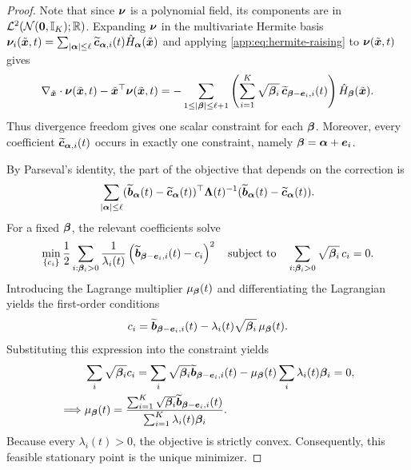 \begin{proof}
Note that since $\boldsymbol{\nu}$ is a polynomial field, its components are in $\mathcal{L}^2(\mathcal{N}(\boldsymbol{0},\mathbb{I}_K);\mathbb{R})$.
Expanding $\boldsymbol{\nu}$ in the multivariate Hermite basis $\boldsymbol{\nu}_i(\tilde{\boldsymbol{x}}, t)=\sum_{|\boldsymbol{\alpha}|\leq\ell}\widetilde{\boldsymbol{c}}_{\boldsymbol{\alpha},i}(t)\hat{H}_{\boldsymbol{\alpha}}(\tilde{\boldsymbol{x}})$ and applying \cref{app:eq:hermite-raising} to $\boldsymbol{\nu}(\tilde{\boldsymbol{x}}, t)$ gives
\begin{equation}\label{app:eq:hermite-stein-action}
\nabla_{\tilde{\boldsymbol{x}}}\cdot\boldsymbol{\nu}(\tilde{\boldsymbol{x}}, t) -\tilde{\boldsymbol{x}}^\top\boldsymbol{\nu}(\tilde{\boldsymbol{x}}, t) =-\sum_{1 \leq |\boldsymbol{\beta}| \leq \ell+1} \left( \sum_{i=1}^K\sqrt{\boldsymbol{\beta}_i}\, \widetilde{\boldsymbol{c}}_{\boldsymbol{\beta}-\boldsymbol{e}_i,i}(t) \right)\hat{H}_{\boldsymbol{\beta}}(\tilde{\boldsymbol{x}}).
\end{equation}
Thus divergence freedom gives one scalar constraint for each $\boldsymbol{\beta}$.
Moreover, every coefficient $\widetilde{\boldsymbol{c}}_{\boldsymbol{\alpha},i}(t)$ occurs in exactly one constraint, namely $\boldsymbol{\beta}=\boldsymbol{\alpha}+\boldsymbol{e}_i$.

By Parseval's identity, the part of the objective that depends on the correction is
\begin{equation*}
\sum_{|\boldsymbol{\alpha}|\leq\ell} (\widetilde{\boldsymbol{b}}_{\boldsymbol{\alpha}}(t)- \widetilde{\boldsymbol{c}}_{\boldsymbol{\alpha}}(t))^\top \boldsymbol{\Lambda}(t)^{-1} (\widetilde{\boldsymbol{b}}_{\boldsymbol{\alpha}}(t)- \widetilde{\boldsymbol{c}}_{\boldsymbol{\alpha}}(t)).
\end{equation*}
For a fixed $\boldsymbol{\beta}$, the relevant coefficients solve
\begin{equation*}
\min_{\{c_i\}}\frac{1}{2}\sum_{i:\boldsymbol{\beta}_i>0}\frac{1}{\lambda_i(t)}\left(\widetilde{\boldsymbol{b}}_{\boldsymbol{\beta}-\boldsymbol{e}_i,i}(t)-c_i\right)^2 \quad\text{subject to}\quad \sum_{i:\boldsymbol{\beta}_i>0}\sqrt{\boldsymbol{\beta}_i}\,c_i=0.
\end{equation*}
Introducing the Lagrange multiplier $\mu_{\boldsymbol{\beta}}(t)$ and differentiating the Lagrangian yields the first-order conditions
\begin{equation*}
c_i = \widetilde{\boldsymbol{b}}_{\boldsymbol{\beta}-\boldsymbol{e}_i,i}(t) -\lambda_i(t)\sqrt{\boldsymbol{\beta}_i}\,\mu_{\boldsymbol{\beta}}(t).
\end{equation*}
Substituting this expression into the constraint yields
\begin{equation*}
\begin{aligned}
&\sum_i\sqrt{\boldsymbol{\beta}_i} c_i = \sum_i\sqrt{\boldsymbol{\beta}_i} \widetilde{\boldsymbol{b}}_{\boldsymbol{\beta}-\boldsymbol{e}_i,i}(t) - \mu_{\boldsymbol{\beta}}(t)\sum_i\lambda_i(t)\boldsymbol{\beta}_i=0,\\
\implies& \mu_{\boldsymbol{\beta}}(t) =\frac{\sum_{i=1}^K\sqrt{\boldsymbol{\beta}_i}\widetilde{\boldsymbol{b}}_{\boldsymbol{\beta}-\boldsymbol{e}_i,i}(t)} {\sum_{i=1}^K\lambda_i(t)\boldsymbol{\beta}_i}.
\end{aligned}
\end{equation*}
Because every $\lambda_i(t)>0$, the objective is strictly convex.
Consequently, this feasible stationary point is the unique minimizer.
\end{proof}

